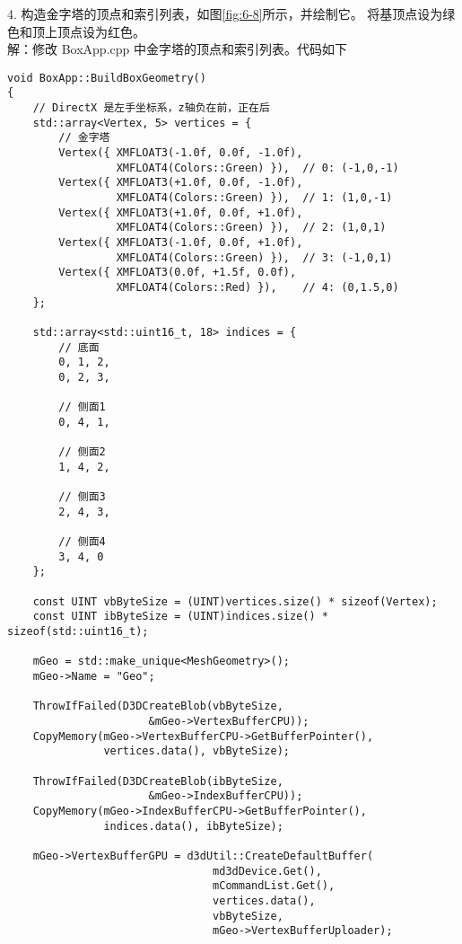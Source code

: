 \begin{flushleft}
4. 构造金字塔的顶点和索引列表，如图\ref{fig:6-8}所示，并绘制它。 将基顶点设为绿色和顶上顶点设为红色。\\
解：修改 BoxApp.cpp 中金字塔的顶点和索引列表。代码如下
\end{flushleft}
\begin{lstlisting}
void BoxApp::BuildBoxGeometry()
{
    // DirectX 是左手坐标系，z轴负在前，正在后
    std::array<Vertex, 5> vertices = {
        // 金字塔
        Vertex({ XMFLOAT3(-1.0f, 0.0f, -1.0f), 
                 XMFLOAT4(Colors::Green) }),  // 0: (-1,0,-1)
        Vertex({ XMFLOAT3(+1.0f, 0.0f, -1.0f), 
                 XMFLOAT4(Colors::Green) }),  // 1: (1,0,-1)
        Vertex({ XMFLOAT3(+1.0f, 0.0f, +1.0f), 
                 XMFLOAT4(Colors::Green) }),  // 2: (1,0,1)
        Vertex({ XMFLOAT3(-1.0f, 0.0f, +1.0f), 
                 XMFLOAT4(Colors::Green) }),  // 3: (-1,0,1)
        Vertex({ XMFLOAT3(0.0f, +1.5f, 0.0f),  
                 XMFLOAT4(Colors::Red) }),    // 4: (0,1.5,0)
    };

    std::array<std::uint16_t, 18> indices = {
        // 底面
        0, 1, 2,
        0, 2, 3,

        // 侧面1
        0, 4, 1,

        // 侧面2
        1, 4, 2,

        // 侧面3
        2, 4, 3,

        // 侧面4
        3, 4, 0
    };

    const UINT vbByteSize = (UINT)vertices.size() * sizeof(Vertex);
    const UINT ibByteSize = (UINT)indices.size() * sizeof(std::uint16_t);

    mGeo = std::make_unique<MeshGeometry>();
    mGeo->Name = "Geo";

    ThrowIfFailed(D3DCreateBlob(vbByteSize, 
                      &mGeo->VertexBufferCPU));
    CopyMemory(mGeo->VertexBufferCPU->GetBufferPointer(), 
               vertices.data(), vbByteSize);

    ThrowIfFailed(D3DCreateBlob(ibByteSize, 
                      &mGeo->IndexBufferCPU));
    CopyMemory(mGeo->IndexBufferCPU->GetBufferPointer(), 
               indices.data(), ibByteSize);

    mGeo->VertexBufferGPU = d3dUtil::CreateDefaultBuffer(
                                md3dDevice.Get(),
                                mCommandList.Get(), 
                                vertices.data(), 
                                vbByteSize, 
                                mGeo->VertexBufferUploader);


\end{lstlisting}
